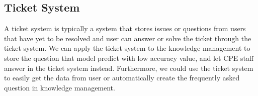 \documentclass[12pt,oneside,openright,a4paper]{cpe-english-project}
\begin{document}
\subsection{Ticket System}
A ticket system is typically a system that stores issues or questions from users that have yet to be resolved
and user can answer or solve the ticket through the ticket system.
We can apply the ticket system to the knowledge management to store the question that model predict
with low accuracy value, and let CPE staff answer in the ticket system instead.
Furthermore, we could use the ticket system to easily get the data from user or
automatically create the frequently asked question in knowledge management.


\nocite{*}



  \\
\end{document}
